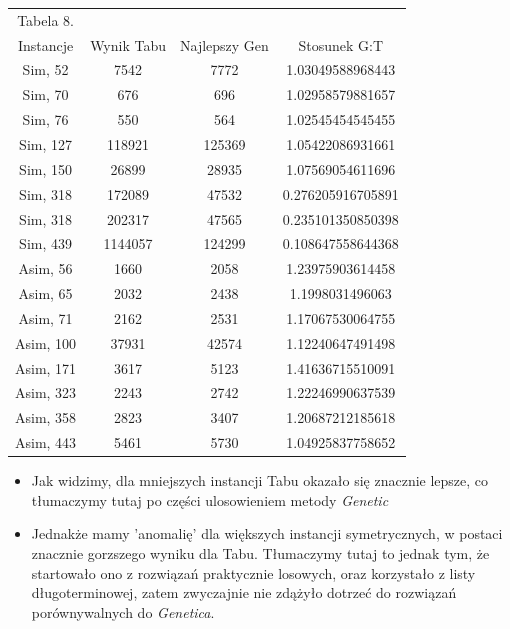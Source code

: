 \documentclass{article}
\begin{document}
\begin{table}[h!]
	\centering
	\begin{tabular}{c||c|c|c}
Tabela 8.\\
Instancje & Wynik Tabu & Najlepszy Gen & Stosunek G:T\\
\hline
Sim, 52 & 7542 & 7772 & 1.03049588968443 \\
Sim, 70 & 676 & 696 & 1.02958579881657 \\
Sim, 76 & 550 & 564 & 1.02545454545455 \\
Sim, 127 & 118921 & 125369 & 1.05422086931661 \\
Sim, 150 & 26899 & 28935 & 1.07569054611696 \\
Sim, 318 & 172089 & 47532 & 0.276205916705891 \\
Sim, 318 & 202317 & 47565 & 0.235101350850398 \\
Sim, 439 & 1144057 & 124299 & 0.108647558644368 \\
Asim, 56 & 1660 & 2058 & 1.23975903614458 \\
Asim, 65 & 2032 & 2438 & 1.1998031496063 \\
Asim, 71 & 2162 & 2531 & 1.17067530064755 \\
Asim, 100 & 37931 & 42574 & 1.12240647491498 \\
Asim, 171 & 3617 & 5123 & 1.41636715510091 \\
Asim, 323 & 2243 & 2742 & 1.22246990637539 \\
Asim, 358 & 2823 & 3407 & 1.20687212185618 \\
Asim, 443 & 5461 & 5730 & 1.04925837758652 \\


	\end{tabular}
\end{table}

\begin{itemize}
	\item Jak widzimy, dla mniejszych instancji Tabu okazało się znacznie lepsze, co tłumaczymy tutaj po części ulosowieniem metody \textit{Genetic}
	\item Jednakże mamy 'anomalię' dla większych instancji symetrycznych, w postaci znacznie gorzszego wyniku dla Tabu. Tłumaczymy tutaj to jednak tym, że startowało ono z rozwiązań praktycznie losowych, oraz korzystało z listy długoterminowej, zatem zwyczajnie nie zdążyło dotrzeć do rozwiązań porównywalnych do \textit{Genetica}.
\end{itemize}
\end{document}
